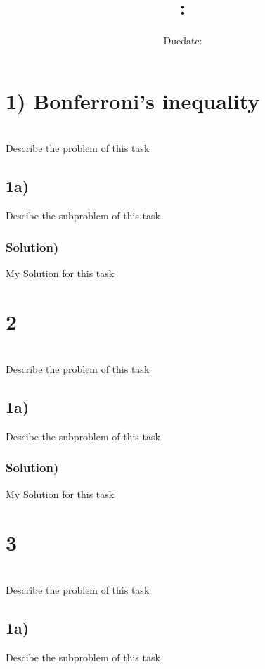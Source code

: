 \documentclass[oneside]{article}
\title{
    \textsf{\textbf{\hmwkSubject: \hmwkTitle}}
}
\author{\hmwkAuthor}
\date{Duedate: \hmwkDueDate}
\begin{document}
\maketitle
\thispagestyle{firststyle}
\vspace{1cm}


\section*{1) Bonferroni's inequality}
\\
Describe the problem of this task

\subsection*{1a)}
Descibe the subproblem of this task

\subsubsection*{Solution)}
My Solution for this task

\pagebreak

\section*{2}
\\
Describe the problem of this task

\subsection*{1a)}
Descibe the subproblem of this task

\subsubsection*{Solution)}
My Solution for this task

\pagebreak

\section*{3}
\\
Describe the problem of this task

\subsection*{1a)}
Descibe the subproblem of this task
\end{document}
